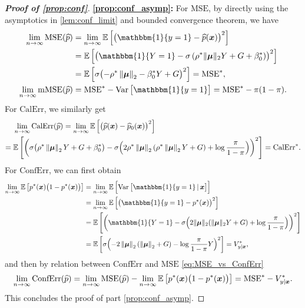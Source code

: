 \begin{proof}[\textbf{Proof of \cref{prop:conf}}]
\textbf{\ref{prop:conf_asymp}:} For $\mathrm{MSE}$, by directly using the asymptotics in \cref{lem:conf_limit} and bounded convergence theorem, we have
\begin{align*}
    \lim_{n \to \infty} \mathrm{MSE}(\hat p) & = \lim_{n \to \infty} \E\left[ \bigl( \mathbbm{1}\{ y = 1 \} - \hat p(\xx) \bigr)^2 \right] \\
    & = \E\left[ \bigl( \mathbbm{1}\{ Y = 1 \} -  \sigma\left( \rho^*\|\vmu\|_2 Y + G + \beta_0^* \right)  \bigr)^2 \right] \\
    & = \E \left[ \sigma \bigl( -\rho^* \norm{\bmu}_2 - \beta_0^* Y + G \bigr)^2 \right] = \mathrm{MSE}^*, 
    \\
    \lim_{n \to \infty} \mathrm{mMSE}(\hat p) & = \mathrm{MSE}^*
    - \var\, \bigl[\mathbbm{1}\{ y = 1 \} \bigr] = \mathrm{MSE}^* - \pi(1 - \pi).
\end{align*}
For $\mathrm{CalErr}$, we similarly get
\begin{align*}
    & \lim_{n \to \infty} \mathrm{CalErr}(\widehat p)
    = \lim_{n \to \infty} \mathbb{E}\left[ \bigl( \widehat p(\text{\boldmath $x$}) - \widehat p_0(\text{\boldmath $x$}) \bigr)^2 \right] \\
    = {} & \mathbb{E}\left[ \left(  \sigma\bigl( \rho^* \left\|{\text{\boldmath $\mu$}}\right\|_2 Y + G + \beta_0^* \bigr)
    - \sigma\Bigl( 2\rho^* \left\|{\text{\boldmath $\mu$}}\right\|_2 (\rho^* \left\|{\text{\boldmath $\mu$}}\right\|_2 Y + G) + \log\frac{\pi}{1-\pi} \Bigr)
     \right)^2 \right]
     = \mathrm{CalErr}^*.
\end{align*}
For $\mathrm{ConfErr}$, we can first obtain
\begin{align*}
    \lim_{n \to \infty} \E \left[ p^*(\xx) \bigl( 1 - p^*(\xx) \bigr) \right]
    & = \lim_{n \to \infty} \E \, \Bigl[ \var\, \bigl[\mathbbm{1}\{ y = 1 \} \,|\, \xx \bigr] \Bigr] \\
    & = \lim_{n \to \infty} \E\left[ \bigl( \mathbbm{1}\{ y = 1 \} - p^*(\xx) \bigr)^2 \right] \\
    & = \E\left[ \left( \mathbbm{1}\{ Y = 1 \} - \sigma \Bigl( 2 \|\bmu\|_2 (\|\bmu\|_2 Y + G) + \log\frac{\pi}{1 - \pi} \Bigr) \right)^2 \right] \\
    & = \E\left[ \sigma\Bigl( -2\norm{\bmu}_2( \norm{\bmu}_2 + G ) - \log\frac{\pi}{1-\pi} Y \Bigr)^2 \right]
    = V_{y|\xx}^*,
\end{align*}
and then by relation between $\mathrm{ConfErr}$ and $\mathrm{MSE}$ \cref{eq:MSE_vs_ConfErr}
\begin{equation*}
    \lim_{n \to \infty} \mathrm{ConfErr}(\widehat p)
    = \lim_{n \to \infty} \mathrm{MSE}(\widehat p) - \lim_{n \to \infty} \mathbb{E} \left[ p^*(\text{\boldmath $x$}) \bigl( 1 - p^*(\text{\boldmath $x$}) \bigr) \right]
    = \mathrm{MSE}^* - V_{y|\text{\boldmath $x$}}^*.
\end{equation*}
This concludes the proof of part \ref{prop:conf_asymp}.


\end{proof}
